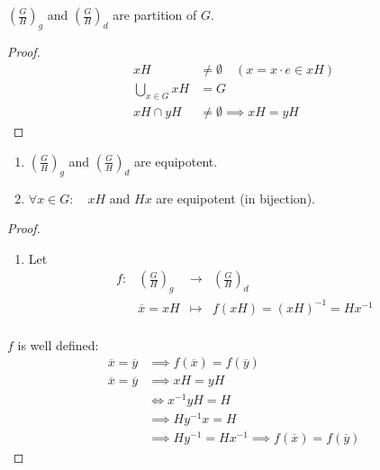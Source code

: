 \begin{proposition}[]
$\left( \frac{G}{H}\right)_{g }$ and 
$\left( \frac{G}{H} \right)_{d}$ are partition 
of $G$. 
\end{proposition}
\begin{proof}
\begin{align*}
  xH & \neq   \emptyset \quad (x = x \cdot  e \in  x H)  \\
     \bigcup_{x \in  G}^{} x H &= G \\
     x H \cap y H & \neq \emptyset  \implies xH = yH
\end{align*}
\end{proof}
\begin{proposition}[]
  \begin{enumerate}
  \item 
$\left( \frac{G}{H} \right)_{g} $ and $\left( \frac{G}{H}\right)_{d} $ are equipotent.
\item $\forall x \in G: \quad  xH$ and $Hx $ are equipotent (in bijection).
  \end{enumerate}
\end{proposition}
\begin{proof}
\begin{enumerate}
\item Let 
  \[
  \begin{array}{cccc}
        f : &  \left( \frac{G}{H} \right)_{g}  & \longrightarrow & \left( \frac{G}{H} \right)_{d} \\
  
             &  \overline{x} = x H  & \longmapsto     & f(xH)  = 
             \left( x H \right)^{-1} = H x^{-1} \\ 
  \end{array}
  \]
\end{enumerate}
$f $ is well defined: 
\begin{align*}
  \overline{x} = \overline{y} & \implies 
  f(\overline{x})  = 
  f( \overline{y})  
  \\
  \overline{x} = \overline{y} & \implies 
  x H = y H  \\
                              & 
                              \iff x^{-1} y H = H 
                              \\
                              & \implies  H y^{-1} x = H
                              \\
                              & \implies 
                              H y^{-1} = H x^{-1} 
                              \implies  
                              f(\overline{x})  = f(\overline{y}) 

\end{align*}
\end{proof}
